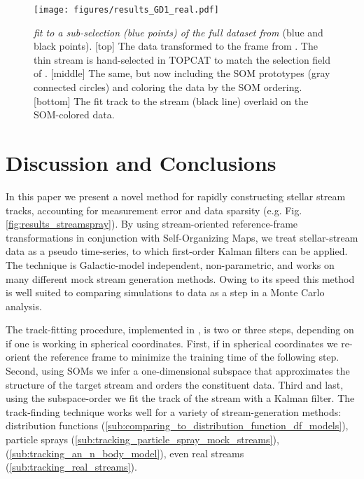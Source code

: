 \documentclass[fleqn,usenatbib]{mnras}
\begin{document}
    \begin{figure}
      \centering
      \texttt{[image: figures/results\_GD1\_real.pdf]}
      \caption{
        \trackstream{} \emph{fit to a sub-selection (blue points) of the full
         dataset from \citet{Price-Whelan2018}} (blue and black
        points).
        [top] The data transformed to the frame from \citet{Koposov2010}. The
        thin stream is hand-selected in TOPCAT \citep{Taylor2005} to match the
        selection field of \citet[][figure 2]{Price-Whelan2018}.
        [middle] The same, but now including the SOM prototypes (gray connected
        circles) and coloring the data by the SOM ordering.
        [bottom] The fit track to the stream (black line) overlaid on the
      SOM-colored data. }
      \label{fig:results_GD1_real}
    \end{figure}
  





\section{Discussion and Conclusions} \label{sec:discussion}

    In this paper we present a novel method for rapidly constructing stellar
    stream tracks, accounting for measurement error and data sparsity  (e.g.
    Fig. \ref{fig:results_streamspray}). By using stream-oriented
    reference-frame transformations in conjunction with Self-Organizing Maps, we
    treat stellar-stream data as a pseudo time-series, to which first-order
    Kalman filters can be applied. The technique is Galactic-model independent,
    non-parametric, and works on many different mock stream generation methods.
    Owing to its speed this method is well suited to comparing simulations to
    data as a step in a Monte Carlo analysis.

    The track-fitting procedure, implemented in
    \href{https://github.com/nstarman/trackstream}{\trackstream{}}, is two or
    three steps, depending on if one is working in spherical coordinates. First,
    if in spherical coordinates we re-orient the reference frame to minimize the
    training time of the following step. Second, using SOMs we infer a
    one-dimensional subspace that approximates the structure of the target
    stream and orders the constituent data. Third and last, using the
    subspace-order we fit the track of the stream with a Kalman filter. The
    track-finding technique works well for a variety of stream-generation
    methods: distribution functions
    (\autoref{sub:comparing_to_distribution_function_df_models}), particle
    sprays (\autoref{sub:tracking_particle_spray_mock_streams}), \nbodys{}
    (\autoref{sub:tracking_an_n_body_model}), even real streams
    (\autoref{sub:tracking_real_streams}).
\end{document}
